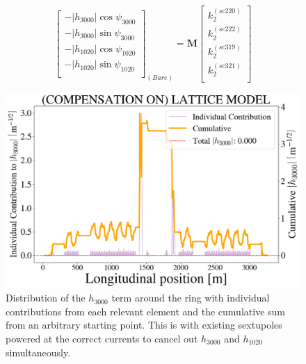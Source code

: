 \begin{equation}
    \begin{bmatrix}
        -|h_{3000}| \cos \psi_{3000} \\
        -|h_{3000}| \sin \psi_{3000} \\
        -|h_{1020}| \cos \psi_{1020} \\
        -|h_{1020}| \sin \psi_{1020} \\
        \end{bmatrix}_{(Bare)}
         =
        \boldsymbol{M}
        \begin{bmatrix}
        k_2^{(sc220)} \\
        k_2^{(sc222)}\\
        k_2^{(sc319)} \\
        k_2^{(sc321)}\\
        \end{bmatrix}
        \label{eq:systemk2s}        
\end{equation}

\begin{figure}[H]
    \centering
    \includegraphics[width=\columnwidth]{chapter4/old_config_h3000.png}
    \caption{Distribution of the $h_{3000}$ term around the ring with individual contributions from each relevant element and the cumulative sum from an arbitrary starting point. This is with existing sextupoles powered at the correct currents to cancel out $h_{3000}$ and $h_{1020}$ simultaneously.}
    \label{fig:h3000oldconfig}
\end{figure}

